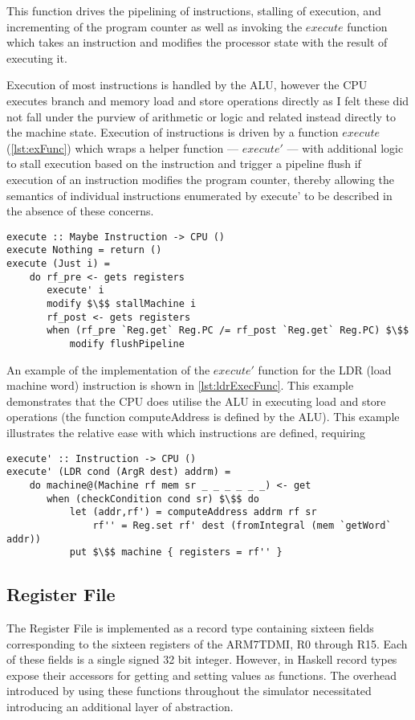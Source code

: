 This function drives the pipelining of instructions, stalling of execution, and incrementing of the program counter as well as invoking the $execute$ function which takes an instruction and modifies the processor state with the result of executing it.

Execution of most instructions is handled by the ALU, however the CPU executes branch and memory load and store operations directly as I felt these did not fall under the purview of arithmetic or logic and related instead directly to the machine state. Execution of instructions is driven by a function $execute$ (\autoref{lst:exFunc}) which wraps a helper function --- $execute'$ --- with additional logic to stall execution based on the instruction and trigger a pipeline flush if execution of an instruction modifies the program counter, thereby allowing the semantics of individual instructions enumerated by execute' to be described in the absence of these concerns.

\begin{lstlisting}[mathescape,numbers=none,caption={The $execute$ function},label={lst:exFunc}]
execute :: Maybe Instruction -> CPU ()
execute Nothing = return ()
execute (Just i) =
    do rf_pre <- gets registers
       execute' i
       modify $\$$ stallMachine i
       rf_post <- gets registers
       when (rf_pre `Reg.get` Reg.PC /= rf_post `Reg.get` Reg.PC) $\$$
           modify flushPipeline
\end{lstlisting}

An example of the implementation of the $execute'$ function for the LDR (load machine word) instruction is shown in \autoref{lst:ldrExecFunc}. This example demonstrates that the CPU does utilise the ALU in executing load and store operations (the function computeAddress is defined by the ALU). This example illustrates the relative ease with which instructions are defined, requiring 

\begin{lstlisting}[mathescape,numbers=none,caption={The $execute'$ function for LDR},label={lst:ldrExecFunc}]
execute' :: Instruction -> CPU ()
execute' (LDR cond (ArgR dest) addrm) =
    do machine@(Machine rf mem sr _ _ _ _ _ _) <- get
       when (checkCondition cond sr) $\$$ do
           let (addr,rf') = computeAddress addrm rf sr
               rf'' = Reg.set rf' dest (fromIntegral (mem `getWord` addr))
           put $\$$ machine { registers = rf'' }
\end{lstlisting}


\subsection{Register File}
\label{subsec:rf}
The Register File is implemented as a record type containing sixteen fields corresponding to the sixteen registers of the ARM7TDMI, R0 through R15. Each of these fields is a single signed 32 bit integer. However, in Haskell record types expose their accessors for getting and setting values as functions. The overhead introduced by using these functions throughout the simulator necessitated introducing an additional layer of abstraction.

